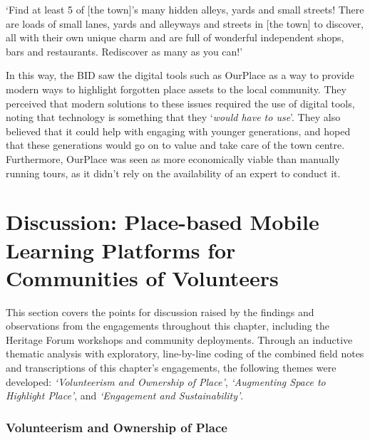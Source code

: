 \begin{displayquote}
`Find at least 5 of [the town]'s many hidden alleys, yards and small streets! There are loads of small lanes, yards and alleyways and streets in [the town] to discover, all with their own unique charm and are full of wonderful independent shops, bars and restaurants. Rediscover as many as you can!'
\end{displayquote}

In this way, the BID saw the digital tools such as OurPlace as a way to provide modern ways to highlight forgotten place assets to the local community. They perceived that modern solutions to these issues required the use of digital tools, noting that technology is something that they `\textit{would have to use}'. They also believed that it could help with engaging with younger generations, and hoped that these generations would go on to value and take care of the town centre. Furthermore, OurPlace was seen as more economically viable than manually running tours, as it didn't rely on the availability of an expert to conduct it.

\section{Discussion: Place-based Mobile Learning Platforms for Communities of Volunteers}
\label{sec:CommunityDiscussion}

This section covers the points for discussion raised by the findings and observations from the engagements throughout this chapter, including the Heritage Forum workshops and community deployments. Through an inductive thematic analysis with exploratory, line-by-line coding of the combined field notes and transcriptions of this chapter's engagements, the following themes were developed: \textit{`Volunteerism and Ownership of Place'}, \textit{`Augmenting Space to Highlight Place'}, and \textit{`Engagement and Sustainability'}.

\subsubsection{Volunteerism and Ownership of Place}

